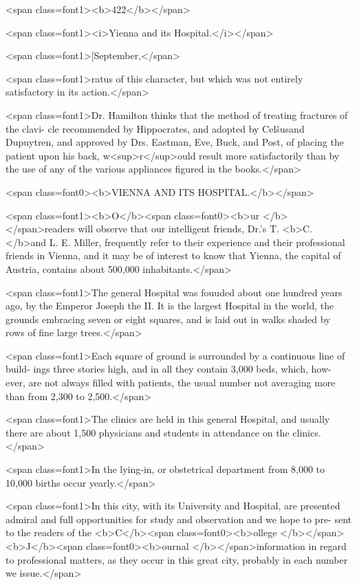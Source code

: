 <span class=font1><b>422</b></span>

<span class=font1><i>Yienna and its Hospital.</i></span>

<span class=font1>[September,</span>

<span class=font1>ratus of this character, but which was not entirely satisfactory in its
action.</span>

<span class=font1>Dr. Hamilton thinks that the method of treating fractures of the clavi-
cle recommended by Hippocrates, and adopted by Celšusand Dupuytren,
and approved by Drs. Eastman, Eve, Buck, and Post, of placing the
patient upon his back, w<sup>r</sup>ould result more satisfactorily than by the use
of any of the various appliances figured in the books.</span>

<span class=font0><b>VIENNA AND ITS HOSPITAL.</b></span>

<span class=font1><b>O</b><span class=font0><b>ur </b></span>readers will observe that our intelligent friends, Dr.'s T. <b>C. </b>and
L. E. Miller, frequently refer to their experience and their professional
friends in Vienna, and it may be of interest to know that Yienna, the
capital of Austria, contains about 500,000 inhabitants.</span>

<span class=font1>The general Hospital was fouuded about one hundred years ago, by
the Emperor Joseph the II. It is the largest Hospital in the world,
the grounds embracing seven or eight squares, and is laid out in walks
shaded by rows of fine large trees.</span>

<span class=font1>Each square of ground is surrounded by a continuous line of build-
ings three stories high, and in all they contain 3,000 beds, which, how-
ever, are not always filled with patients, the usual number not averaging
more than from 2,300 to 2,500.</span>

<span class=font1>The clinics are held in this general Hospital, and usually there are
about 1,500 physicians and students in attendance on the clinics.</span>

<span class=font1>In the lying-in, or obstetrical department from 8,000 to 10,000 births
occur yearly.</span>

<span class=font1>In this city, with its University and Hospital, are presented admiral
and full opportunities for study and observation and we hope to pre-
sent to the readers of the <b>C</b><span class=font0><b>ollege </b></span><b>J</b><span class=font0><b>ournal </b></span>information in regard to
professional matters, as they occur in this great city, probably in each
number we issue.</span>

